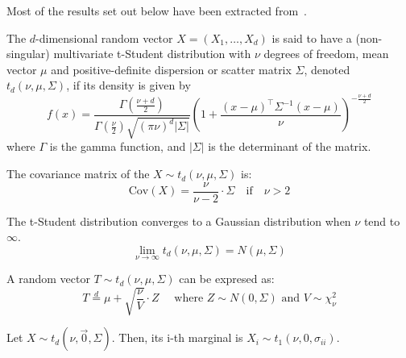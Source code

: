 \documentclass[11pt,fleqn]{book} %
\begin{document}
Most of the results set out below have been extracted from~\cite{kotz:2004,demarta:2005}.

\begin{definition}
	The $d$-dimensional random vector $X=(X_1,\dots,X_d)$ is said to have a 
	(non-singular) multivariate t-Student distribution with $\nu$ degrees of freedom, 
	mean vector $\mu$ and positive-definite dispersion or scatter matrix $\Sigma$, 
	denoted $t_d(\nu,\mu,\Sigma)$, if its density is given by
	\begin{displaymath}
		f(x)=\frac{\Gamma\left(\frac{\nu+d}{2}\right)}{\Gamma\left(\frac{\nu}{2}\right)\sqrt{(\pi \nu)^d |\Sigma|}}
		\left(
		1+ \frac{(x-\mu)^\top\Sigma^{-1}(x-\mu)}{\nu}
		\right)^{-\frac{\nu+d}{2}}
	\end{displaymath}
	\noindent where $\Gamma$ is the gamma function, and $|\Sigma|$ is the 
	determinant of the matrix.
\end{definition}

\begin{proposition}
	The covariance matrix of the $X \sim t_d(\nu,\mu,\Sigma)$ is:
	\begin{displaymath}
		\text{Cov}(X) = \frac{\nu}{\nu-2} \cdot \Sigma \quad \text{if} \quad \nu > 2
	\end{displaymath}
\end{proposition}

\begin{proposition}
	The t-Student distribution converges to a Gaussian distribution 
	when $\nu$ tend to $\infty$.
	\begin{displaymath}
		\lim_{\nu \to \infty} t_d(\nu,\mu,\Sigma) = N(\mu,\Sigma)
	\end{displaymath}
\end{proposition}

\begin{proposition}
	\label{prop:mtschar}
	A random vector $T \sim t_d(\nu,\mu,\Sigma)$ can be expresed as:
	\begin{displaymath}
		T \stackrel{d}{=} \mu + \sqrt{\frac{\nu}{V}}\cdot Z
		\quad \text{ where } Z \sim N(0,\Sigma) \text{ and } V \sim \chi_{\nu}^2
	\end{displaymath}
\end{proposition}

\begin{proposition}
	Let $X \sim t_d(\nu,\vec{0},\Sigma)$. Then, its i-th marginal is 
	$X_i \sim t_1(\nu,0,\sigma_{ii})$.
\end{proposition}
\end{document}
